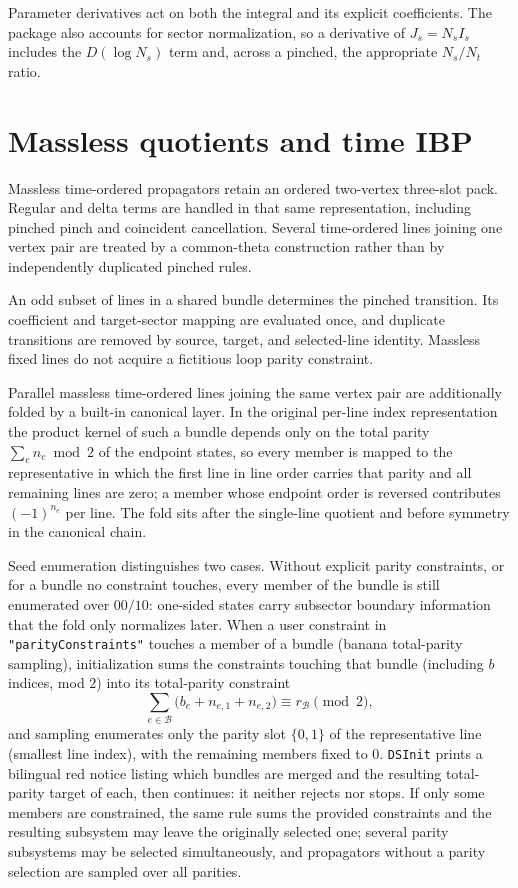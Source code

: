 ﻿\documentclass[a4paper,11pt]{article}
\begin{document}
Parameter derivatives act on both the integral and its explicit coefficients. The package
also accounts for sector normalization, so a derivative of $J_s=N_s I_s$ includes the
$D(\log N_s)$ term and, across a pinched, the appropriate $N_s/N_t$ ratio.

\section{Massless quotients and time IBP}

Massless time-ordered propagators retain an ordered two-vertex three-slot pack. Regular and delta
terms are handled in that same representation, including pinched pinch and coincident
cancellation. Several time-ordered lines joining one vertex pair are treated by a common-theta
construction rather than by independently duplicated pinched rules.

An odd subset of lines in a shared bundle determines the pinched transition. Its coefficient
and target-sector mapping are evaluated once, and duplicate transitions are removed by source,
target, and selected-line identity. Massless fixed lines do not acquire a fictitious loop
parity constraint.

Parallel massless time-ordered lines joining the same vertex pair are additionally folded by a
built-in canonical layer. In the original per-line index representation the product kernel of
such a bundle depends only on the total parity $\sum_en_e\bmod 2$ of the endpoint states, so
every member is mapped to the representative in which the first line in line order carries
that parity and all remaining lines are zero; a member whose endpoint order is reversed
contributes $(-1)^{n_e}$ per line. The fold sits after the single-line quotient and before
symmetry in the canonical chain.

Seed enumeration distinguishes two cases. Without explicit parity constraints, or for a
bundle no constraint touches, every member of the bundle is still enumerated over $00/10$:
one-sided states carry subsector boundary information that the fold only normalizes later.
When a user constraint in \texttt{"parityConstraints"} touches a member of a bundle (banana
total-parity sampling), initialization sums the constraints touching that bundle (including
$b$ indices, mod $2$) into its total-parity constraint
\begin{equation}
 \sum_{e\in\mathcal B}\bigl(b_e+n_{e,1}+n_{e,2}\bigr)\equiv r_{\mathcal B}\pmod 2,
 \label{bundleTotalParityManualEn}
\end{equation}
and sampling enumerates only the parity slot $\{0,1\}$ of the representative line (smallest
line index), with the remaining members fixed to $0$. \texttt{DSInit} prints a bilingual red
notice listing which bundles are merged and the resulting total-parity target of each, then
continues: it neither rejects nor stops. If only some members are constrained, the same rule
sums the provided constraints and the resulting subsystem may leave the originally selected
one; several parity subsystems may be selected simultaneously, and propagators without a
parity selection are sampled over all parities.
\end{document}
